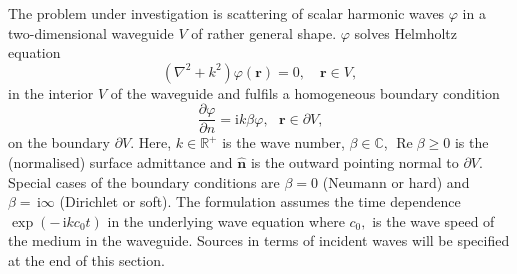 \documentclass[numreferences]{kluwer}
\renewcommand{\phi}{\varphi}
\renewcommand{\Re}{\operatorname{Re}}
\renewcommand{\i}{\,\mathrm{i}}
\newcommand{\e}{\,\mathrm{e}}
\begin{document}



The problem under investigation is scattering of scalar harmonic waves
$\phi$ in a two-dimensional waveguide $V$ of rather general
shape. $\phi$ solves Helmholtz equation%
\begin{equation}
  (\nabla^{2}+k^{2})\phi(\bm{r})=0,\quad\bm{r}\in V, \label{101}%
\end{equation}
in the interior $V$ of the waveguide and fulfils a homogeneous
boundary condition%
\begin{equation}
  \dfrac{\partial \phi}{\partial n}=\text{i}k\beta \phi,
  \text{ }\bm{r}\in\partial V\text{,} \label{102}%
\end{equation}
on the boundary $\partial V$. Here, $k\in\mathbb{R}^{+}$ is the wave
number, $\beta\in\mathbb{C}$, $\Re\beta\geq0$ is the (normalised)
surface admittance and $\widehat{\bm{n}}$ is the outward pointing
normal to $\partial V$. Special cases of the boundary conditions are
$\beta=0$ (Neumann or hard) and $\beta=\i\infty$ (Dirichlet or
soft). The formulation assumes the time dependence $\exp(-\i kc_{0}t)$
in the underlying wave equation where $c_{0},$ is the wave speed of
the medium in the waveguide. Sources in terms of incident waves will
be specified at the end of this section.
\end{document}
